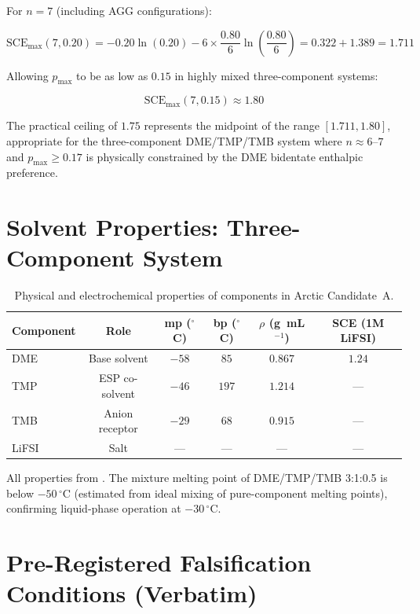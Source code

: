 \documentclass[11pt]{article}
\theoremstyle{plain}
\theoremstyle{definition}
\theoremstyle{remark}
\begin{document}
For $n = 7$ (including AGG configurations):

\begin{equation}
  \mathrm{SCE}_{\max}(7, 0.20) =
  -0.20\ln(0.20) - 6 \times \frac{0.80}{6}\ln\left(\frac{0.80}{6}\right)
  = 0.322 + 1.389 = 1.711
\end{equation}

Allowing $p_{\max}$ to be as low as $0.15$ in highly mixed
three-component systems:

\begin{equation}
  \mathrm{SCE}_{\max}(7, 0.15) \approx 1.80
\end{equation}

The practical ceiling of $1.75$ represents the midpoint of the
range $[1.711, 1.80]$, appropriate for the three-component
DME/TMP/TMB system where $n \approx 6$--$7$ and
$p_{\max} \geq 0.17$ is physically constrained by the DME
bidentate enthalpic preference.

\section{Solvent Properties: Three-Component System}
\label{app:props}

\begin{table}[h!]
\centering
\caption{Physical and electrochemical properties of components
in Arctic Candidate~A.}
\label{tab:arctic_props}
\begin{tabular}{lccccc}
\toprule
Component & Role & mp ($^\circ$C) & bp ($^\circ$C) &
  $\rho$ (g~mL$^{-1}$) & SCE (1M LiFSI) \\
\midrule
DME & Base solvent & $-58$ & $85$ & $0.867$ & $1.24$ \\
TMP & ESP co-solvent & $-46$ & $197$ & $1.214$ & --- \\
TMB & Anion receptor & $-29$ & $68$ & $0.915$ & --- \\
LiFSI & Salt & --- & --- & --- & --- \\
\bottomrule
\end{tabular}
\end{table}

\noindent All properties from \cite{CRC2024}.
The mixture melting point of DME/TMP/TMB 3:1:0.5 is below
$-50\,^\circ$C (estimated from ideal mixing of pure-component
melting points), confirming liquid-phase operation at
$-30\,^\circ$C.

\section{Pre-Registered Falsification Conditions (Verbatim)}
\label{app:falsification}
\end{document}
